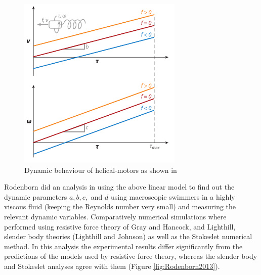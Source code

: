 \begin{figure}[ht]
	\centering
  \includegraphics[width=0.7\textwidth]{Pictures/LinearSpeed1.png}
	\caption{Dynamic behaviour of helical-motors as shown in \cite{Nelson2010}}
	\label{fig:LinearSpeed1}
\end{figure}

Rodenborn did an analysis in \cite{Rodenborn2013} using the above linear model to find out the dynamic parameters $a,b,c,$ and $d$ using macroscopic swimmers in a highly viscous fluid (keeping the Reynolds number very small) and measuring the relevant dynamic variables. Comparatively numerical simulations where performed using resistive force theory of Gray and Hancock, and Lighthill, slender body theories (Lighthill and Johnson) as well as the Stokeslet numerical method. In this analysis the experimental results differ significantly from the predictions of the models used by resistive force theory, whereas the slender body and Stokeslet analyses agree with them (Figure \ref{fig:Rodenborn2013}). \\

